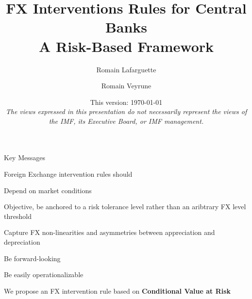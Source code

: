 \documentclass{beamer}
\title[]{FX Interventions Rules for Central Banks\\
A Risk-Based Framework}
\author[]{Romain Lafarguette \and Romain Veyrune}
\institute[]{MCM Central Bank Operations Division}
\date[]{\scriptsize This version: \today \\ \vspace{0.5cm} \scriptsize{\textit{The views
      expressed in this presentation do not necessarily represent the views of
      the IMF, its Executive Board, or IMF management.}} \vspace{-0.3cm}}
\newenvironment{largeitemize}{\itemize\addtolength{\itemsep}{10pt}}{\enditemize}
\begin{document}
\begingroup
\renewcommand{\insertframenumber}{}
\begin{frame}
  \addtocounter{framenumber}{-1}
\maketitle
\end{frame}
\endgroup


\begin{frame}{Key Messages}

  Foreign Exchange intervention rules should\\
  \medskip
  
  \begin{largeitemize}
  \item Depend on market conditions
  \item Objective, be anchored to a risk tolerance level
    rather than an aribtrary FX level threshold
  \item Capture FX non-linearities and asymmetries between appreciation and
    depreciation
  \item Be forward-looking
  \item Be easily operationalizable\\
  \end{largeitemize}

\medskip  
We propose an FX intervention rule based on \textbf{Conditional Value at Risk}
  
\end{frame}


\begin{frame}
\setlength\tabcolsep{2pt}  %
\tiny  %

  \end{frame}



\end{document}
